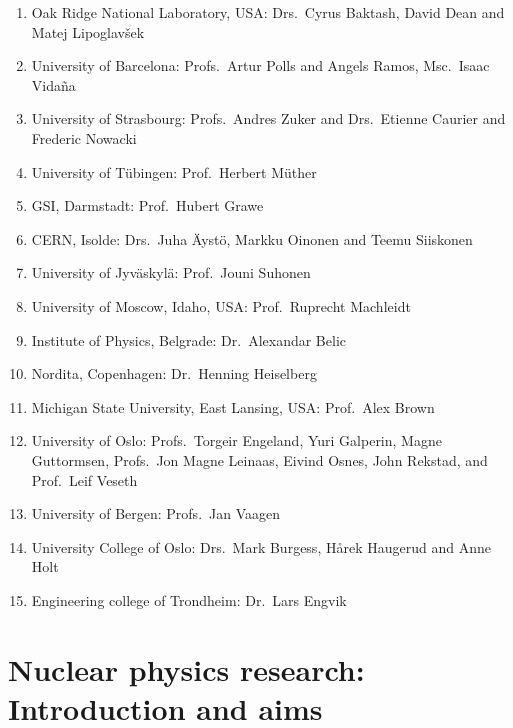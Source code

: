 \begin{enumerate} 

\item Oak Ridge National Laboratory, USA:
Drs.\ Cyrus Baktash, David Dean and Matej Lipoglav\v{s}ek

\item University of Barcelona: 
Profs.\ Artur Polls and Angels Ramos, Msc.\ Isaac Vida\~na

\item University of Strasbourg:
Profs.\ Andres Zuker and Drs.~Etienne Caurier and  
Frederic Nowacki

\item University of T\"ubingen: Prof.\  Herbert M\"uther 

\item GSI, Darmstadt: Prof.\  Hubert Grawe

\item CERN, Isolde: Drs.\ Juha \"Ayst\"o, Markku Oinonen and Teemu Siiskonen

\item University of Jyv\"askyl\"a: Prof.\ Jouni Suhonen

\item University of Moscow, Idaho, USA: Prof.\ Ruprecht Machleidt 

\item Institute of Physics, Belgrade: Dr.~Alexandar Belic

\item Nordita, Copenhagen: Dr.\ Henning Heiselberg 

\item Michigan State University, East Lansing,
USA: Prof.\ Alex Brown 

\item University of Oslo: Profs.\ Torgeir Engeland, Yuri Galperin,
Magne Guttormsen, Profs.~Jon Magne Leinaas,  Eivind Osnes, John Rekstad, 
and Prof.~Leif Veseth

\item University of Bergen: Profs.~Jan Vaagen

\item University College of Oslo: Drs.~Mark Burgess, H\aa rek Haugerud and
Anne Holt
\item Engineering college of Trondheim: Dr.~Lars Engvik 
\end{enumerate}



\section{Nuclear physics research: Introduction and aims}

